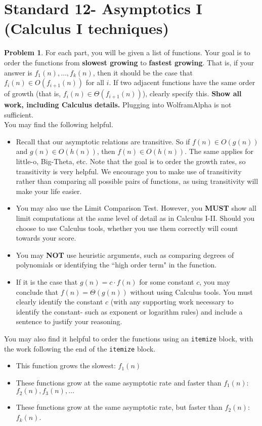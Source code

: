 \documentclass[11pt]{article}
\theoremstyle{definition}
\theoremstyle{definition}
\newtheorem{required}{Problem}
\theoremstyle{definition}
\begin{document}
\section{Standard 12- Asymptotics I (Calculus I techniques)}
\begin{required}
For each part, you will be given a list of functions. Your goal is to order the functions from \textbf{slowest growing} to \textbf{fastest growing}. That is, if your answer is $f_{1}(n), \ldots, f_{k}(n)$, then it should be the case that $f_{i}(n) \in O(f_{i+1}(n))$ for all $i$. If two adjacent functions have the same order of growth (that is, $f_{i}(n) \in \Theta(f_{i+1}(n))$), clearly specify this. \textbf{Show all work, including Calculus details.} Plugging into WolframAlpha is not sufficient. \\

\noindent You may find the following helpful.
\begin{itemize}
\item Recall that our asymptotic relations are transitive. So if $f(n) \in O(g(n))$ and $g(n) \in O(h(n))$, then $f(n) \in O(h(n))$. The same applies for little-o, Big-Theta, etc. Note that the goal is to order the growth rates, so transitivity is very helpful. We encourage you to make use of transitivity rather than comparing all possible pairs of functions, as using transitivity will make your life easier.

\item You may also use the Limit Comparison Test. However, you \textbf{MUST} show all limit computations at the same level of detail as in Calculus I-II. Should you choose to use Calculus tools, whether you use them correctly will count towards your score.

\item You may \textbf{NOT} use heuristic arguments, such as comparing degrees of polynomials or identifying the ``high order term" in the function.

\item If it is the case that $g(n) = c \cdot f(n)$ for some constant $c$, you may conclude that $f(n) = \Theta(g(n))$ without using Calculus tools. You must clearly identify the constant $c$ (with any supporting work necessary to identify the constant- such as exponent or logarithm rules) and include a sentence to justify your reasoning. 
\end{itemize}


\noindent You may also find it helpful to order the functions using an \texttt{itemize} block, with the work following the end of the \texttt{itemize} block.
\begin{itemize}
\item This function grows the slowest: $f_{1}(n)$
\item These functions grow at the same asymptotic rate and faster than $f_{1}(n)$: $f_{2}(n), f_{3}(n), \ldots$
\item These functions grow at the same asymptotic rate, but faster than $f_{2}(n)$: $f_{k}(n)$.
\end{itemize}



\end{required}
\end{document}
